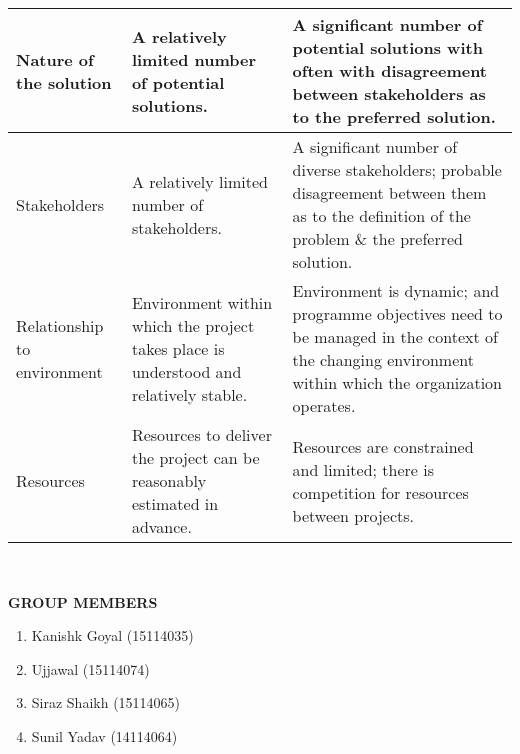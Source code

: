 \documentclass[11pt]{article}
\begin{document}
\begin{large}
\begin{flushleft}
\begin{tabular}{|p{4cm}|p{6cm}|p{6cm}|}
\hline

Nature of the solution	& A relatively limited number of potential solutions. 	& A significant number of potential solutions with often with disagreement between stakeholders as to the preferred solution.\\

\hline
 
Stakeholders	& A relatively limited number of stakeholders. 	& A significant number of diverse stakeholders; probable disagreement between them as to the definition of the problem \& the preferred solution. \\

\hline

Relationship to environment	&
Environment within which the project takes place is understood and relatively stable.	&
Environment is dynamic; and programme objectives need to be managed in the context of the changing environment within which the organization operates. \\

Resources	&
Resources to deliver the project can be reasonably estimated in advance. 	&
Resources are constrained and limited; there is competition for resources between projects.\\


\hline
\end{tabular}
\end{flushleft}

\leavevmode\thispagestyle{empty}\newpage
\
\
\
\
\

\begin{flushleft}


\begin{Large}
\textbf{GROUP MEMBERS}
\end{Large}
	\begin{enumerate}
\item Kanishk Goyal (15114035)
		
\item Ujjawal (15114074)
		
\item Siraz Shaikh (15114065)
		
\item Sunil Yadav (14114064)
	
		
	\end{enumerate}
	
\end{flushleft}
\end{large}
\end{document}

